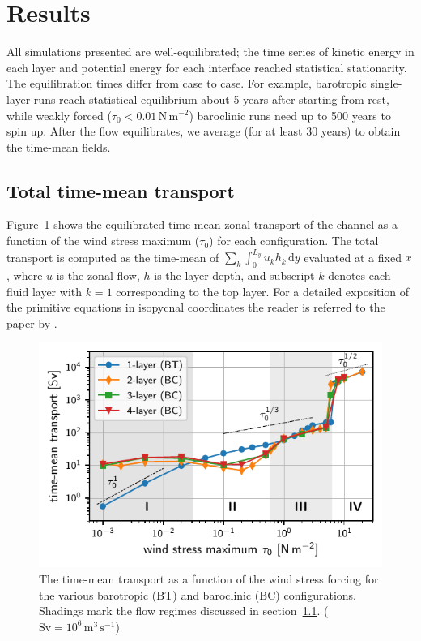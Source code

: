 \documentclass{agujournal2019}
\newcommand{\Pa}		{\mathrm{N}\,\mathrm{m}^{-2}}
\begin{document}
\section{Results}

All simulations presented are well-equilibrated; {\color{black}the time series of kinetic energy in each layer and potential energy for each interface reached statistical stationarity}. The equilibration times differ from case to case. For example, barotropic single-layer runs reach statistical equilibrium about 5 years after starting from rest, while weakly forced ($\tau_0<0.01\,\Pa$) baroclinic runs need up to 500 years to spin up. After the flow equilibrates, we average (for at least 30 years) to obtain the time-mean fields.


\subsection{Total time-mean transport}\label{sec:transport}

Figure~\ref{fig:transport} shows the equilibrated time-mean zonal transport of the channel as a function of the wind stress maximum ($\tau_0$) for each configuration. The total transport is computed as the time-mean of $\sum_k\int_0^{L_y} u_k h_k\,\mathrm{d}y$ evaluated at a fixed $x$, where $u$ is the zonal flow, $h$ is the layer depth, and subscript $k$ denotes each fluid layer with $k=1$ corresponding to the top layer. For a detailed exposition of the primitive equations in isopycnal coordinates the reader is referred to the paper by .

\begin{figure}
\centering
\noindent\includegraphics{transport/transport}
\vspace*{-1em}\caption{The time-mean transport as a function of the wind stress forcing for the various barotropic (BT) and baroclinic (BC) configurations. Shadings mark the flow regimes discussed in section~\ref{sec:transport}.  ($\text{Sv} = 10^6\,\text{m}^3\,\text{s}^{-1}$)}\label{fig:transport}\vspace*{-3em}
\end{figure}
\end{document}
